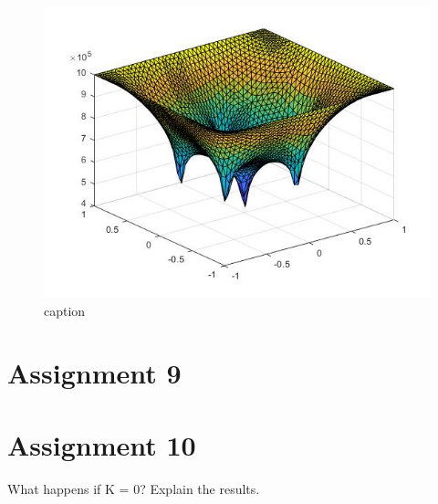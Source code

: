 \documentclass[a4paper]{report}
\begin{document}
\begin{figure}[ht!]
	\centering
	\includegraphics[width=150mm]{3Dv.jpg}
	\caption{caption
	\label{overflow}}
\end{figure}

\section{Assignment 9}






\section{Assignment 10}

What happens if K = 0? Explain the results.



\newpage

\appendix
\end{document}
